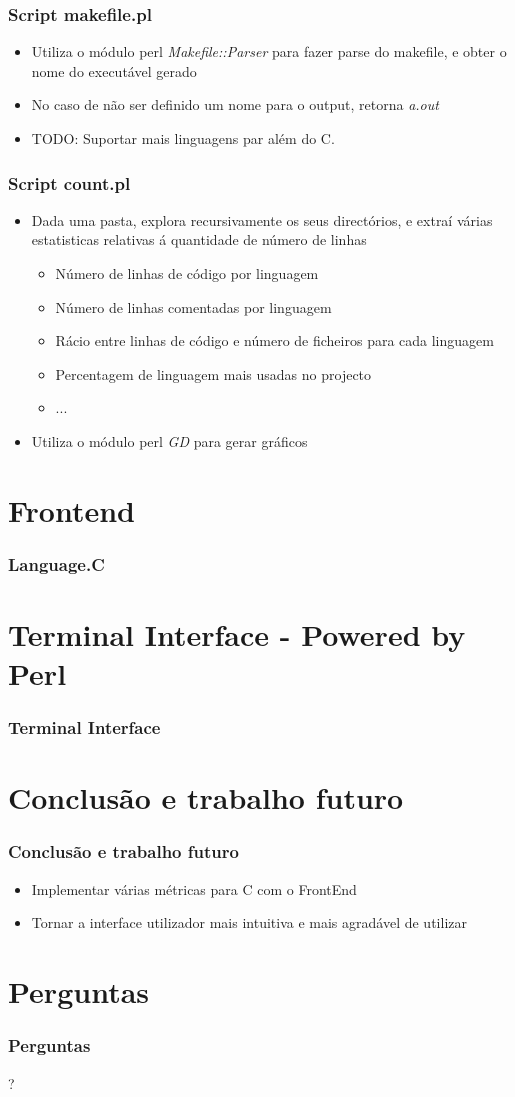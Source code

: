 \documentclass{beamer}
\begin{document}
\begin{frame} \frametitle{Script makefile.pl}
\begin{itemize} 
\item Utiliza o módulo perl \textit{Makefile::Parser} para fazer parse do makefile, e obter o nome do executável gerado
\item No caso de não ser definido um nome para o output, retorna \textit{a.out}
\item TODO: Suportar mais linguagens par além do C.
\end{itemize}
\end{frame}

\begin{frame} \frametitle{Script count.pl}
\begin{itemize} 
\item Dada uma pasta, explora recursivamente os seus directórios, e extraí várias estatisticas relativas á quantidade de número de linhas
  \begin{itemize}
    \item Número de linhas de código por linguagem
    \item Número de linhas comentadas por linguagem
	\item Rácio entre linhas de código e número de ficheiros para cada linguagem
	\item Percentagem de linguagem mais usadas no projecto
	\item ...
  \end{itemize}
\item Utiliza o módulo perl \textit{GD} para gerar gráficos
\end{itemize}
\end{frame}

\section{Frontend}
\begin{frame} \frametitle{Language.C}
\end{frame}

\section{Terminal Interface - Powered by Perl}
\begin{frame} \frametitle{Terminal Interface}
\end{frame}

\section{Conclusão e trabalho futuro}
\begin{frame} \frametitle{Conclusão e trabalho futuro}
\begin{itemize}
\item Implementar várias métricas para C com o FrontEnd
\item Tornar a interface utilizador mais intuitiva e mais agradável de utilizar
\end{itemize}
\end{frame}


\section*{Perguntas}
\begin{frame} \frametitle{Perguntas}
\begin{center}\huge{?}\end{center}
\end{frame}
\end{document}
